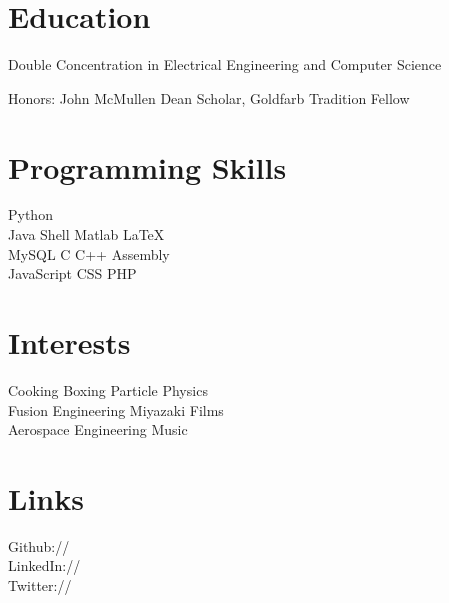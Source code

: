 \documentclass[]{deedy-resume-openfont}
\begin{document}
\section{Education}
        \begin{tightemize}
        \item
            Double Concentration in Electrical Engineering and Computer Science
        \item
            Honors: John McMullen Dean Scholar, Goldfarb Tradition Fellow
        \end{tightemize}
\sectionsep

\begin{minipage}[t]{0.42\textwidth}
    \section{Programming Skills}
        Python \\
        Java \textbullet{}
        Shell \textbullet{}
        Matlab \textbullet{}
        \LaTeX\ \\
        MySQL \textbullet{}
        C \textbullet{}
        C++ \textbullet{}
        Assembly \\
        JavaScript \textbullet{}
        CSS \textbullet{}
        PHP \\
\end{minipage}
\hfill
\begin{minipage}[t]{0.35\textwidth}
    \section{Interests}
        Cooking \textbullet{}
        Boxing \textbullet{}
        Particle Physics \\
        Fusion Engineering \textbullet{}
        Miyazaki Films \\
        Aerospace Engineering \textbullet{}
        Music 
\end{minipage}
\hfill
\begin{minipage}[t]{0.22\textwidth}
    \section{Links}
        Github:// \href{https://github.com/paulkiernan}{}\\
        LinkedIn:// \href{https://www.linkedin.com/pub/paul-kiernan/24/a32/470}{}\\
        Twitter:// \href{https://twitter.com/gaelic}{}\\
\end{minipage}
\end{document}
